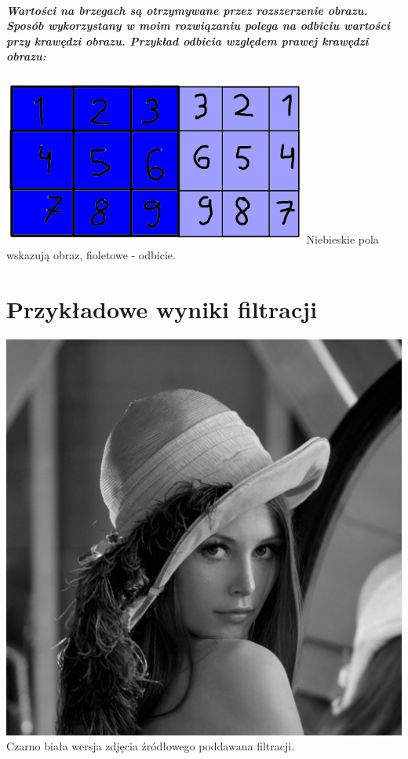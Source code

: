 \documentclass[a4paper,12pt,openany]{report}
\begin{document}
\pagebreak
\paragraph{\indent Wartości na brzegach są otrzymywane przez rozszerzenie obrazu. Sposób wykorzystany w moim rozwiązaniu polega na odbiciu wartości przy krawędzi obrazu. Przykład odbicia względem prawej krawędzi obrazu:}

\begin{center}
\includegraphics[width=10cm]{resources/reflect.png}
\linebreak
\tiny{Niebieskie pola wskazują obraz, fioletowe - odbicie.}
\end{center}

\chapter{Przykładowe wyniki filtracji}

\begin{center}
\includegraphics[width=15cm]{resources/modified/lena_gray.jpg}
\linebreak
\tiny{Czarno biała wersja zdjęcia źródłowego poddawana filtracji.}
\end{center}
\end{document}
